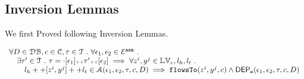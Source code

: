 \subsection{Inversion Lemmas}
We first Proved following Inversion Lemmas.

\clearpage
\begin{thm}
\label{thm:alg_correct}
\[
  \begin{array}{l}
    \forall D \in \mathcal{DB} , c \in \mathcal{C}, \mathtt{\tau} \in \mathcal{T} ~.~ \forall \mathtt{\epsilon}_1, \mathtt{\epsilon}_2 \in \mathcal{E}^{\mathtt{{asn}}} ~.~
    \\ \quad 
     \exists \mathtt{\tau}' \in \mathcal{T} ~.~ \mathtt{\tau} = \cdot [\mathtt{\epsilon}_1] {\scriptscriptstyle ++} \mathtt{\tau}' {\scriptscriptstyle ++} [\mathtt{\epsilon}_2]
     \implies    \forall  z^i, y^j \in \mathbb{LV}_c, l_h, l_t ~.~ 
    \\ \qquad 
     l_h ++ [z^i, y^j] ++ l_t \in \mathcal{A}(\mathtt{\epsilon}_1, \mathtt{\epsilon}_2, \mathtt{\tau}, c, D)
     \implies \mathtt{flowsTo}(z^i, y^j, c) \land \mathsf{DEP_{\mathtt{e}}}(\mathtt{\epsilon}_1, \mathtt{\epsilon}_2, \mathtt{\tau}, {c}, D) 
  \end{array}
\]
\end{thm}

